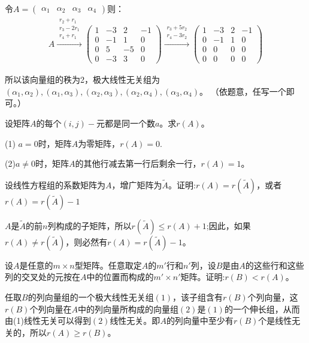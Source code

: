 \documentclass[a4paper]{report}
\begin{document}
\begin{jie}
令$A=
\begin{pmatrix}
\alpha_1& \alpha_2& \alpha_3& \alpha_4
\end{pmatrix}
$则：
\begin{align*}
A\xrightarrow{\substack{r_{2}+r_1 \\ r_3-2r_1\\ r_4+r_1}}{
\begin{pmatrix}
1&-3&2&-1\\ 0&-1&1&0\\ 0&5&-5&0\\ 0&-3&3&0
\end{pmatrix}
}\xrightarrow{\substack{r_{3}+5r_2 \\ r_4-3r_2}}{
\begin{pmatrix}
1&-3&2&-1\\ 0&-1&1&0\\ 0&0&0&0\\ 0&0&0&0
\end{pmatrix}
}
\end{align*}

所以该向量组的秩为2，极大线性无关组为
$(\alpha_1,\alpha_2),(\alpha_1,\alpha_3),(\alpha_2,\alpha_3),(\alpha_2,\alpha_4),(\alpha_3,\alpha_4)$。 （依题意，任写一个即可。）
\end{jie}

\EX 设矩阵$A$的每个$(i,j)-$元都是同一个数$a$。求$r(A)$。

\begin{jie}
(1) $a=0$时，矩阵$A$为零矩阵，$r(A)=0$.

(2)$a\neq 0$时，矩阵$A$的其他行减去第一行后剩余一行，$r(A)=1$。
\end{jie}

\EX 设线性方程组的系数矩阵为$A$，增广矩阵为$\widetilde{A}$。证明:$r(A)=r(\widetilde{A})$，或者$r(A)=r(\widetilde{A})-1$

\begin{zhengming}
$A$是$\widetilde{A}$的前$n$列构成的子矩阵，所以$r(\widetilde{A})\leq r(A)+1$;因此，如果$r(A)\neq r(\widetilde{A})$，则必然有$r(A)=r(\widetilde{A})-1$。
\end{zhengming}

\EX 设$A$是任意的$m\times n$型矩阵。任意取定$A$的$m'$行和$n'$列，设$B$是由$A$的这些行和这些列的交叉处的元按在$A$中的位置而构成的$m'\times n'$矩阵。证明:$r(B)<r(A)$。

\begin{zhengming}
任取$B$的列向量组的一个极大线性无关组$(1)$，该子组含有$r(B)$个列向量，这$r(B)$个列向量在$A$中的列向量所构成的向量组$(2)$是$(1)$的一个伸长组，从而由(1)线性无关可以得到$(2)$线性无关。即$A$的列向量中至少有$r(B)$个是线性无关的，所以$r(A)\geq r(B)$。
\end{zhengming}
\end{document}
